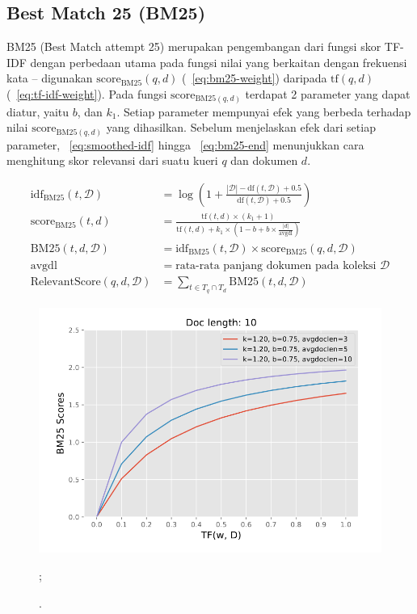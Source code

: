     \subsection{\f{Best Match 25} (BM25)}
    \label{sec:bm25}

    BM25 (\f{Best Match attempt} 25)  merupakan pengembangan dari fungsi skor TF-IDF dengan perbedaan utama pada fungsi nilai yang berkaitan dengan frekuensi kata -- digunakan $\text{score}_{\text{BM25}}(q,d)$ (\equ~\ref{eq:bm25-weight}) daripada $\text{tf}(q,d)$ (\equ~\ref{eq:tf-idf-weight}). Pada fungsi $\text{score}_{\text{BM25}(q,d)}$ terdapat 2 parameter yang dapat diatur, yaitu $b$, dan $k_1$. Setiap parameter mempunyai efek yang berbeda terhadap nilai $\text{score}_{\text{BM25}(q,d)}$ yang dihasilkan. Sebelum menjelaskan efek dari setiap parameter, \equ~\ref{eq:smoothed-idf} hingga \equ~\ref{eq:bm25-end} menunjukkan cara menghitung skor relevansi dari suatu kueri $q$ dan dokumen $d$. 

    \begin{align}
        \label{eq:smoothed-idf}
        \text{idf}_{\text{BM25}}(t, \mathcal{D}) &= \log\left(1+\frac{|\mathcal{D}| - \text{df}(t, \mathcal{D}) + 0.5}{\text{df}(t, \mathcal{D}) + 0.5}\right) \\
        \label{eq:bm25scoring}
        \text{score}_{\text{BM25}}(t,d) &= \frac{\text{tf}(t, d) \times (k_1 + 1)}{\text{tf}(t, d) + k_1 \times (1 - b + b \times \frac{|d|}{\text{avgdl}})} \\
        \label{eq:bm25-weight}
        \text{BM25}(t, d, \mathcal{D}) &= \text{idf}_{\text{BM25}}(t, \mathcal{D}) \times \text{score}_{\text{BM25}}(q,d,\mathcal{D}) \\
        \text{avgdl} &= \text{rata-rata panjang dokumen pada koleksi } \mathcal{D} \\
        \label{eq:bm25-end}
        \text{RelevantScore}(q,d,\mathcal{D}) &= \sum_{t \in T_q \cap T_d} \text{BM25}(t, d, \mathcal{D})
    \end{align}

    \begin{figure}
        \centering
        \includegraphics[width=1\textwidth]{assets/pics/effect-bm25-long-doc.png}
        \caption{\license.};
        \label{fig:effect-bm25-long-doc}
    \end{figure}

